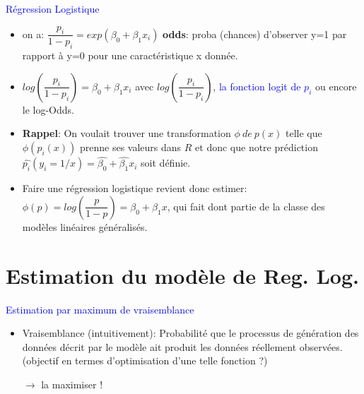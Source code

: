 \documentclass[12pt,aspectratio=1610]{beamer}
\begin{document}
\begin{frame}
		\textcolor{blue}{\large Régression Logistique}
	\begin{itemize}
		\item on a: $\dfrac{p_i}{1-p_i}=exp(\beta_0+\beta_1x_i)$ \pause \textbf{odds}: proba (chances) d'observer y=1 par rapport à y=0 pour une caractéristique x donnée. 
		\pause
		\item $log(\dfrac{p_i}{1-p_i})=\beta_0+\beta_1x_i$ avec  $log(\dfrac{p_i}{1-p_i})$, 	\textcolor{blue}{la fonction logit de $ p_i$} ou encore le log-Odds.
		
		\pause
		
		\item 	\textbf{Rappel}: On voulait trouver une transformation $\phi~de~ p(x)$ telle que $\phi(p_i(x))$ prenne 	ses valeurs dans $R$ et donc que notre prédiction  $\hat{p_i}(y_i=1/x)=\hat{\beta_0}+\hat{\beta_1}x_i$ soit définie.
		
		\pause
		\item Faire une régression logistique revient donc estimer: $\phi(p)=log(\dfrac{p}{1-p})=\beta_0+\beta_1x$, qui fait dont partie de la classe des modèles linéaires généralisés.
	\end{itemize}
\end{frame}



\section{Estimation du modèle de Reg. Log.}


\begin{frame}
	
			\textcolor{blue}{\large Estimation par  maximum de vraisemblance}
			
\begin{itemize}
	
\item  Vraisemblance (intuitivement): Probabilité  que le processus de génération des données décrit par le modèle ait produit les données réellement observées. (objectif en termes d'optimisation d'une telle fonction ?) \pause 

$\rightarrow$ la maximiser !

 
\end{itemize}


\end{frame}
\end{document}
